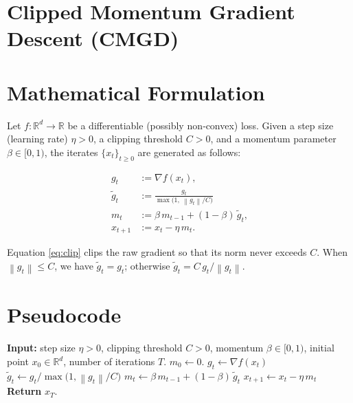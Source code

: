 \documentclass{article}
\newcommand{\norm}[1]{\left\lVert#1\right\rVert}
\newcommand{\grad}{\nabla}
\begin{document}
\section*{Clipped Momentum Gradient Descent (CMGD)}

\section*{Mathematical Formulation}
Let $f:\mathbb{R}^{d}\rightarrow\mathbb{R}$ be a differentiable (possibly non‑convex) loss.  
Given a step size (learning rate) $\eta>0$, a clipping threshold $C>0$, and a momentum
parameter $\beta\in[0,1)$, the iterates $\{x_t\}_{t\ge 0}$ are generated as follows:

\begin{align}
g_t &:= \grad f(x_t),                                              \tag{1}\\
\tilde g_t &:= \frac{g_t}{\max\!\bigl(1,\; \norm{g_t}/C\bigr)}      \label{eq:clip}\\
m_t &:= \beta\, m_{t-1} + (1-\beta)\,\tilde g_t,                    \tag{2}\\
x_{t+1} &:= x_t - \eta\, m_t.                                       \tag{3}
\end{align}

Equation \eqref{eq:clip} clips the raw gradient so that its norm never exceeds $C$.
When $\norm{g_t}\le C$, we have $\tilde g_t=g_t$; otherwise $\tilde g_t = C\, g_t/\norm{g_t}$.

\section*{Pseudocode}
\begin{algorithm}[H]
\caption{Clipped Momentum Gradient Descent}
\begin{algorithmic}[1]
\State \textbf{Input:} step size $\eta>0$, clipping threshold $C>0$, momentum $\beta\in[0,1)$,
initial point $x_0\in\mathbb{R}^d$, number of iterations $T$.
\State $m_0\gets 0$.
    \State $g_t \gets \grad f(x_t)$                                      
    \State $\tilde g_t \gets g_t / \max\bigl(1,\norm{g_t}/C\bigr)$       
    \State $m_t \gets \beta\, m_{t-1} + (1-\beta)\,\tilde g_t$            
    \State $x_{t+1} \gets x_t - \eta\, m_t$                               
\EndFor
\State \textbf{Return} $x_T$.
\end{algorithmic}
\end{algorithm}
\end{document}
